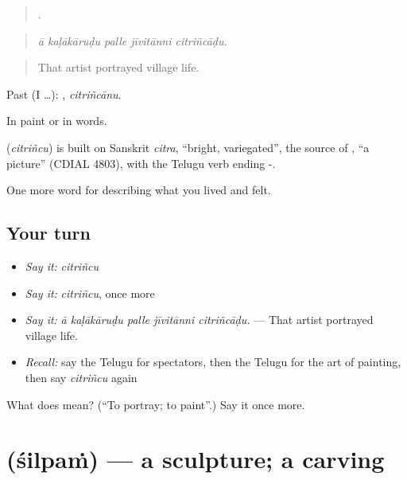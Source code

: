 \begin{quote}
    .
\end{quote}

\begin{quote}
\emph{ā kaḷākāruḍu palle jīvitānni citriñcāḍu.}
\end{quote}

\begin{quote}
That artist portrayed village life.
\end{quote}

Past (I …): , \emph{citriñcānu}.

In paint or in words.

\begin{cousinweb}
\textbf{} (\emph{citriñcu}) is built on Sanskrit \emph{citra}, \textquotedblleft{}bright, variegated\textquotedblright{}, the source of , \textquotedblleft{}a picture\textquotedblright{} (CDIAL 4803), with the Telugu verb ending -.
\end{cousinweb}

\begin{grammarlens}[title={What you've built}]
One more word for describing what you lived and felt.
\end{grammarlens}

\subsection*{Your turn}
\begin{itemize}
\raggedright
  \item \emph{Say it:} \emph{citriñcu}
  \item \emph{Say it:} \emph{citriñcu}, once more
  \item \emph{Say it:} \emph{ā kaḷākāruḍu palle jīvitānni citriñcāḍu.} — That artist portrayed village life.
  \item \emph{Recall:} say the Telugu for spectators, then the Telugu for the art of painting, then say \emph{citriñcu} again
\end{itemize}

\begin{tcolorbox}[breakable,colback=teal!4,colframe=teal!35!black,title={Before you move on}]
What does  mean? (\textquotedblleft{}To portray; to paint\textquotedblright{}.) Say it once more.
\end{tcolorbox}
\section[\texorpdfstring{\te{శిల్పం} (śilpaṁ)}{శిల్పం (śilpaṁ)}]{ (śilpaṁ) — a sculpture; a carving}

